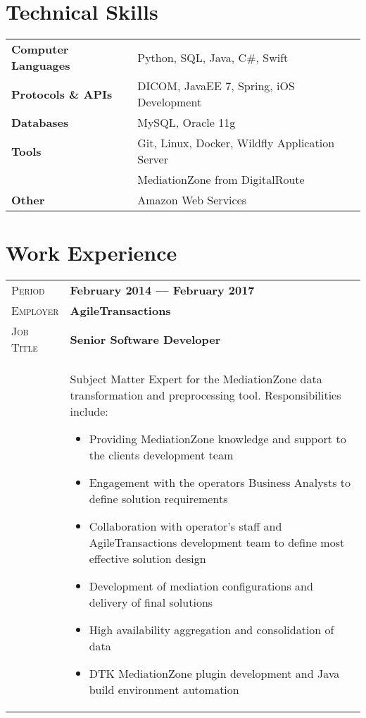 \documentclass[letter, oneside, final]{scrartcl} %
\newcommand{\gray}{\rowcolor[gray]{.90}} %
\begin{document}
\begin{center}
\section{Technical Skills}

\begin{tabular}{ @{} >{\bfseries}l @{\hspace{6ex}} l }
Computer Languages & Python, SQL, Java, C\#, Swift \\
Protocols \& APIs & DICOM, JavaEE 7, Spring, iOS Development \\
Databases & MySQL, Oracle 11g \\
Tools & Git, Linux, Docker, Wildfly Application Server \\
& MediationZone from DigitalRoute \\
Other & Amazon Web Services
\end{tabular}


\section{Work Experience}

\begin{tabularx}{0.97\linewidth}{>{\raggedleft\scshape}p{2cm}X}
	\gray Period & \textbf{February 2014 --- February 2017}\\
	\gray Employer & \textbf{AgileTransactions}\\
	\gray Job Title & \textbf{Senior Software Developer}\\
	& Subject Matter Expert for the MediationZone data transformation and preprocessing tool. Responsibilities include: 
	\begin{itemize}
		\item Providing MediationZone knowledge and support to the clients development team
		\item Engagement with the operators Business Analysts to define solution requirements
		\item Collaboration with operator’s staff and AgileTransactions development team to define most effective solution design
		\item Development of mediation configurations and delivery of final solutions
		\item High availability aggregation and consolidation of data
		\item DTK MediationZone plugin development and Java build environment automation
	\end{itemize}
\end{tabularx}


\end{center}
\end{document}
